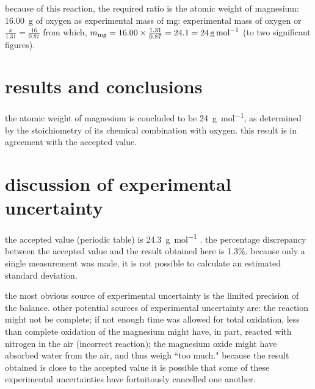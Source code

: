 \documentclass{article}
\begin{document}
because of this reaction, the required ratio is the atomic weight of
magnesium: \SI{16.00}{\gram} of oxygen as experimental mass of mg:
experimental mass of oxygen or $\frac{x}{1.31}=\frac{16}{0.87}$ from
which, $m_{\ce{mg}} = 16.00 \times \frac{1.31}{0.87} = 24.1 =
\SI{24}{\gram\per\mole}$ (to two significant figures).


\section{results and conclusions}

the atomic weight of magnesium is concluded to be
\SI{24}{\gram\per\mol}, as determined by the stoichiometry of its
chemical combination with oxygen. this result is in agreement with the
accepted value.



\section{discussion of experimental uncertainty}

the accepted value (periodic table) is \SI{24.3}{\gram\per\mole}
\cite{smith:2012qr}. the percentage discrepancy between the accepted
value and the result obtained here is 1.3\%. because only a single
measurement was made, it is not possible to calculate an estimated
standard deviation.

the most obvious source of experimental uncertainty is the limited
precision of the balance. other potential sources of experimental
uncertainty are: the reaction might not be complete; if not enough
time was allowed for total oxidation, less than complete oxidation of
the magnesium might have, in part, reacted with nitrogen in the air
(incorrect reaction); the magnesium oxide might have absorbed water
from the air, and thus weigh ``too much." because the result obtained
is close to the accepted value it is possible that some of these
experimental uncertainties have fortuitously cancelled one another.
\end{document}
